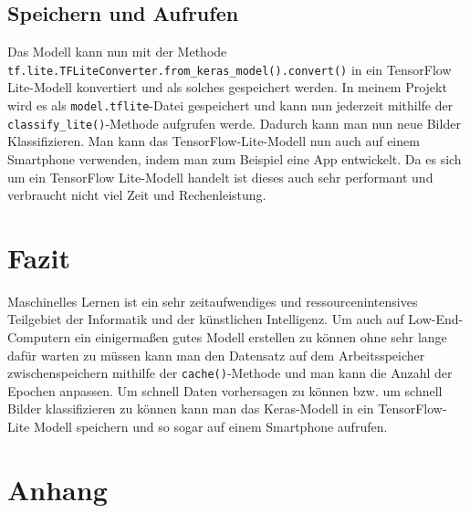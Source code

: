\documentclass[11pt,oneside]{report}
\begin{document}
\section{Speichern und Aufrufen}
Das Modell kann nun mit der Methode \verb+tf.lite.TFLiteConverter.from_keras_model().convert()+ in ein TensorFlow Lite-Modell konvertiert und als solches gespeichert werden. In meinem Projekt wird es als \verb+model.tflite+-Datei gespeichert und kann nun jederzeit mithilfe der \verb+classify_lite()+-Methode aufgrufen werde. Dadurch kann man nun neue Bilder Klassifizieren. Man kann das TensorFlow-Lite-Modell nun auch auf einem Smartphone verwenden, indem man zum Beispiel eine App entwickelt. Da es sich um ein TensorFlow Lite-Modell handelt ist dieses auch sehr performant und verbraucht nicht viel Zeit und Rechenleistung.


\chapter{Fazit}
Maschinelles Lernen ist ein sehr zeitaufwendiges und ressourcenintensives Teilgebiet der Informatik und der künstlichen Intelligenz. Um auch auf Low-End-Computern ein einigermaßen gutes Modell erstellen zu können ohne sehr lange dafür warten zu müssen kann man den Datensatz auf dem Arbeitsspeicher zwischenspeichern mithilfe der \verb+cache()+-Methode 
und man kann die Anzahl der Epochen anpassen. Um schnell Daten vorhersagen zu können bzw. um schnell Bilder klassifizieren zu können kann man das Keras-Modell in ein TensorFlow-Lite Modell speichern und so sogar auf einem Smartphone aufrufen.


\appendix
\chapter{Anhang}


\lstset{style=code}
\end{document}
